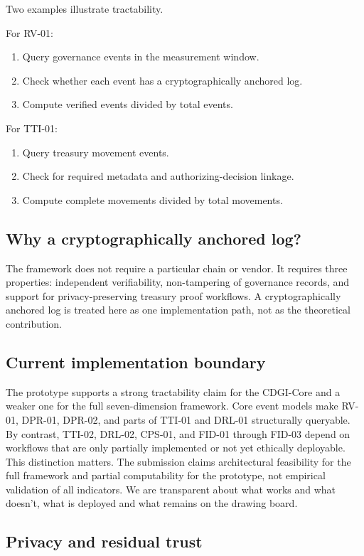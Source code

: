 \documentclass[sigconf]{acmart}
\begin{document}
Two examples illustrate tractability.

For RV-01:
\begin{enumerate}
\item Query governance events in the measurement window.
\item Check whether each event has a cryptographically anchored log.
\item Compute verified events divided by total events.
\end{enumerate}

For TTI-01:
\begin{enumerate}
\item Query treasury movement events.
\item Check for required metadata and authorizing-decision linkage.
\item Compute complete movements divided by total movements.
\end{enumerate}

\subsection{Why a cryptographically anchored log?}

The framework does not require a particular chain or vendor. It requires three properties: independent verifiability, non-tampering of governance records, and support for privacy-preserving treasury proof workflows. A cryptographically anchored log is treated here as one implementation path, not as the theoretical contribution.

\subsection{Current implementation boundary}

The prototype supports a strong tractability claim for the CDGI-Core and a weaker one for the full seven-dimension framework. Core event models make RV-01, DPR-01, DPR-02, and parts of TTI-01 and DRL-01 structurally queryable. By contrast, TTI-02, DRL-02, CPS-01, and FID-01 through FID-03 depend on workflows that are only partially implemented or not yet ethically deployable. This distinction matters. The submission claims architectural feasibility for the full framework and partial computability for the prototype, not empirical validation of all indicators. We are transparent about what works and what doesn’t, what is deployed and what remains on the drawing board.

\subsection{Privacy and residual trust}
\end{document}
